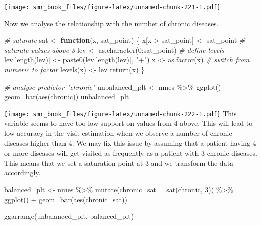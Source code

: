 \documentclass[
  oneside]{book}
\newenvironment{Shaded}{\begin{snugshade}}{\end{snugshade}}
\newcommand{\AttributeTok}[1]{\textcolor[rgb]{0.77,0.63,0.00}{#1}}
\newcommand{\CommentTok}[1]{\textcolor[rgb]{0.56,0.35,0.01}{\textit{#1}}}
\newcommand{\ControlFlowTok}[1]{\textcolor[rgb]{0.13,0.29,0.53}{\textbf{#1}}}
\newcommand{\DecValTok}[1]{\textcolor[rgb]{0.00,0.00,0.81}{#1}}
\newcommand{\FunctionTok}[1]{\textcolor[rgb]{0.00,0.00,0.00}{#1}}
\newcommand{\NormalTok}[1]{#1}
\newcommand{\OtherTok}[1]{\textcolor[rgb]{0.56,0.35,0.01}{#1}}
\newcommand{\SpecialCharTok}[1]{\textcolor[rgb]{0.00,0.00,0.00}{#1}}
\newcommand{\StringTok}[1]{\textcolor[rgb]{0.31,0.60,0.02}{#1}}
\begin{document}
\texttt{[image: smr\_book\_files/figure-latex/unnamed-chunk-221-1.pdf]}

Now we analyse the relationship with the number of chronic diseases.

\begin{Shaded}
\begin{Highlighting}[]
\CommentTok{\# saturate}
\NormalTok{sat }\OtherTok{\textless{}{-}} \ControlFlowTok{function}\NormalTok{(x, sat\_point) \{}
\NormalTok{  x[x }\SpecialCharTok{\textgreater{}}\NormalTok{ sat\_point] }\OtherTok{\textless{}{-}}\NormalTok{ sat\_point }\CommentTok{\# saturate values above 3}
\NormalTok{  lev }\OtherTok{\textless{}{-}} \FunctionTok{as.character}\NormalTok{(}\DecValTok{0}\SpecialCharTok{:}\NormalTok{sat\_point) }\CommentTok{\# define levels}
\NormalTok{  lev[}\FunctionTok{length}\NormalTok{(lev)] }\OtherTok{\textless{}{-}} \FunctionTok{paste0}\NormalTok{(lev[}\FunctionTok{length}\NormalTok{(lev)], }\StringTok{"+"}\NormalTok{)}
\NormalTok{  x }\OtherTok{\textless{}{-}} \FunctionTok{as.factor}\NormalTok{(x) }\CommentTok{\# switch from numeric to factor}
  \FunctionTok{levels}\NormalTok{(x) }\OtherTok{\textless{}{-}}\NormalTok{ lev}
  \FunctionTok{return}\NormalTok{(x)}
\NormalTok{\}}

\CommentTok{\# analyse predictor "chronic"}
\NormalTok{unbalanced\_plt }\OtherTok{\textless{}{-}}\NormalTok{ nmes }\SpecialCharTok{\%\textgreater{}\%}
  \FunctionTok{ggplot}\NormalTok{() }\SpecialCharTok{+}
  \FunctionTok{geom\_bar}\NormalTok{(}\FunctionTok{aes}\NormalTok{(chronic))}
\NormalTok{unbalanced\_plt}
\end{Highlighting}
\end{Shaded}

\texttt{[image: smr\_book\_files/figure-latex/unnamed-chunk-222-1.pdf]}
This variable seems to have too low support on values from 4 above. This will lead
to low accuracy in the visit estimation when we observe a number of chronic diseases higher than 4.
We may fix this issue by assuming that a patient having 4 or more diseases will get visited as
frequently as a patient with 3 chronic diseases. This means that we set a saturation point at 3
and we transform the data accordingly.

\begin{Shaded}
\begin{Highlighting}[]
\NormalTok{balanced\_plt }\OtherTok{\textless{}{-}}\NormalTok{ nmes }\SpecialCharTok{\%\textgreater{}\%}
  \FunctionTok{mutate}\NormalTok{(}\AttributeTok{chronic\_sat =} \FunctionTok{sat}\NormalTok{(chronic, }\DecValTok{3}\NormalTok{)) }\SpecialCharTok{\%\textgreater{}\%}
  \FunctionTok{ggplot}\NormalTok{() }\SpecialCharTok{+}
  \FunctionTok{geom\_bar}\NormalTok{(}\FunctionTok{aes}\NormalTok{(chronic\_sat))}

\FunctionTok{ggarrange}\NormalTok{(unbalanced\_plt, balanced\_plt)}
\end{Highlighting}
\end{Shaded}
\end{document}
